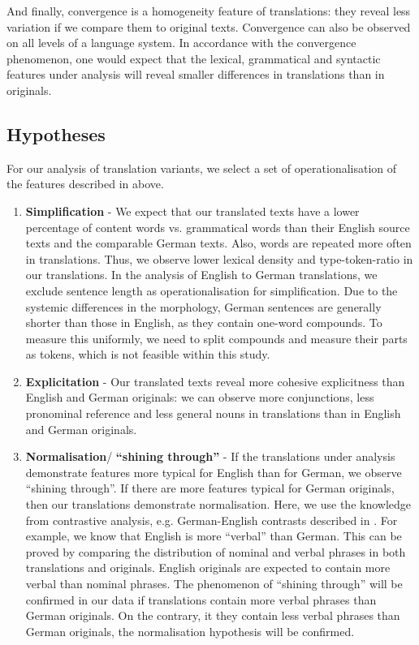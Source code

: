 \documentclass[output=paper]{LSP/langsci}
\begin{document}
And finally, convergence is a homogeneity feature of translations:  they reveal less variation if we compare them to original texts.  Convergence can also be observed on all levels of a language system. In accordance with the convergence phenomenon, one would expect that the lexical, grammatical and syntactic features under analysis will reveal smaller differences in translations than in originals.

\subsection{Hypotheses} \label{sec:4:2:3}

For our analysis of translation variants, we select a set of operationalisation of the features described in  above. 
 
\begin{enumerate}
\item \textbf{Simplification} - We expect that our translated texts have a lower percentage of content words vs. grammatical words than their English source texts and the comparable German texts. Also, words are repeated more often in translations. Thus, we observe lower lexical density and type-token-ratio in our translations. In the analysis of English to German translations, we exclude sentence length as operationalisation for simplification. Due to the systemic differences in the morphology, German sentences are generally shorter than those in English, as they contain one-word compounds. To measure this uniformly, we need to split compounds and measure their parts as tokens, which is not feasible within this study.

\item \textbf{Explicitation} - Our translated texts reveal more cohesive explicitness than English and German originals: we can observe more conjunctions, less pronominal reference and less general nouns in translations than in English and German originals.

\item \textbf{Normalisation}/ \textbf{“shining through”} - If the translations under analysis demonstrate features more typical for English than for German, we observe “shining through”. If there are more features typical for German originals, then our translations demonstrate normalisation. Here, we use the knowledge from contrastive analysis, e.g. German-English contrasts described in \citep{Hawkins1986,KoenigGast2007,Steiner2012}. For example, we know that English is more “verbal” than German. This can be proved by comparing the distribution of nominal and verbal phrases in both translations and originals. English originals are expected to contain more verbal than nominal phrases. The phenomenon of “shining through” will be confirmed in our data if translations contain more verbal phrases than German originals. On the contrary, it they contain less verbal phrases than German originals, the normalisation hypothesis will be confirmed.


\end{enumerate}
\end{document}
